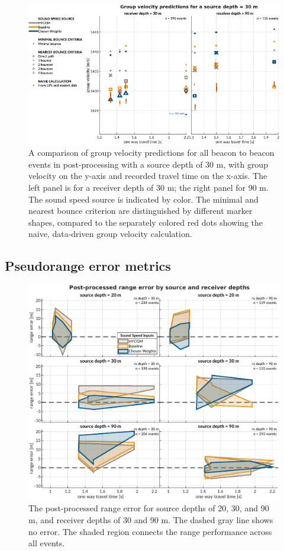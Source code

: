 \begin{figure}[h!]
\includegraphics[width=\columnwidth]{figs/Fig5.pdf}
\caption{A comparison of group velocity predictions for all beacon to beacon events in post-processing with a source depth of 30 m, with group velocity on the y-axis and recorded travel time on the x-axis. The left panel is for a receiver depth of 30 m; the right panel for 90 m. The sound speed source is indicated by color. The minimal and nearest bounce criterion are distinguished by different marker shapes, compared to the separately colored red dots showing the naive, data-driven group velocity calculation.}
\label{fig:gvel30}
\end{figure}

\subsection{Pseudorange error metrics}

\begin{figure}[!ht]
\includegraphics[width=\textwidth]{figs/Fig6.pdf}
\caption{The post-processed range error for source depths of 20, 30, and 90 m, and receiver depths of 30 and 90 m. The dashed gray line shows no error. The shaded region connects the range performance across all events.}
\label{fig:rangeError}
\end{figure}

